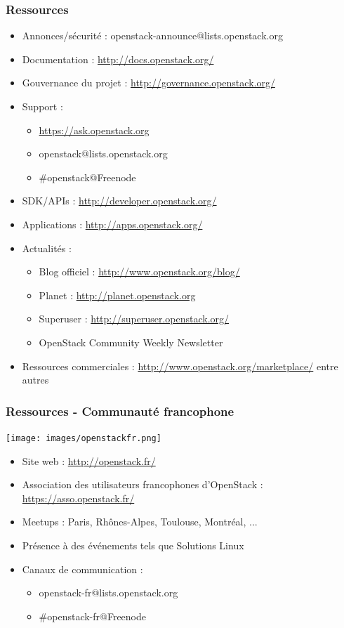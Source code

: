   \begin{frame}
    \frametitle{Ressources}
    \begin{itemize}
      \item Annonces/sécurité : openstack-announce@lists.openstack.org
      \item Documentation : \url{http://docs.openstack.org/}
      \item Gouvernance du projet : \url{http://governance.openstack.org/}
      \item Support :
      \begin{itemize}
        \item \url{https://ask.openstack.org}
        \item openstack@lists.openstack.org
        \item \#openstack@Freenode
      \end{itemize}
      \item SDK/APIs : \url{http://developer.openstack.org/}
      \item Applications : \url{http://apps.openstack.org/}
      \item Actualités :
      \begin{itemize}
        \item Blog officiel : \url{http://www.openstack.org/blog/}
        \item Planet : \url{http://planet.openstack.org}
        \item Superuser : \url{http://superuser.openstack.org/}
        \item OpenStack Community Weekly Newsletter
      \end{itemize}
    \item Ressources commerciales : \url{http://www.openstack.org/marketplace/} entre autres
    \end{itemize}
  \end{frame}

  \begin{frame}
    \frametitle{Ressources - Communauté francophone}
    \texttt{[image: images/openstackfr.png]}
    \begin{itemize}
      \item Site web : \url{http://openstack.fr/}
      \item Association des utilisateurs francophones d'OpenStack : \url{https://asso.openstack.fr/}
      \item Meetups : Paris, Rhônes-Alpes, Toulouse, Montréal, ...
      \item Présence à des événements tels que Solutions Linux
      \item Canaux de communication :
      \begin{itemize}
        \item openstack-fr@lists.openstack.org
        \item \#openstack-fr@Freenode
      \end{itemize}
    \end{itemize}
  \end{frame}

